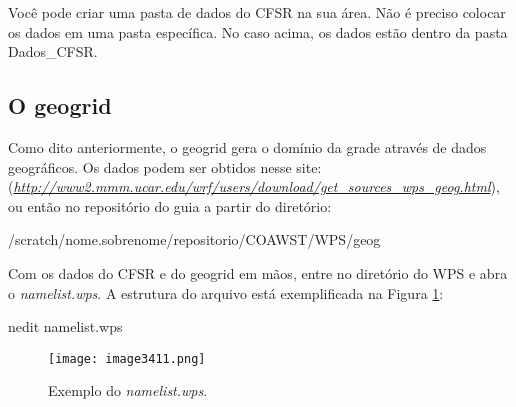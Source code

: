 \begin{tcolorbox}[enhanced,
  grow to left by=0cm,%
  grow to right by=0cm,%
  enlarge top by=0cm,%
  enlarge bottom by=0cm,%
  tcbox raise base,
  boxrule=1.0pt,
  left=18mm,
  colframe=red!50!black,coltext=red!25!black,colback=red!10!white,
  overlay={\begin{tcbclipinterior}\fill[red!75!blue!50!white] (frame.south west)
    rectangle node[text=white,font=\sffamily\bfseries\footnotesize,rotate=0] {ATENÇÃO} ([xshift=18mm]frame.north west);\end{tcbclipinterior}}]
Você pode criar uma pasta de dados do CFSR na sua área. Não é preciso colocar os dados em uma pasta específica. No caso acima, os dados estão dentro da pasta Dados\_CFSR.
\end{tcolorbox}
\bigskip

\subsection{O geogrid}\label{geowps}
\bigskip

\noindent Como dito anteriormente, o geogrid gera o domínio da grade através de dados geográficos. Os dados podem ser obtidos nesse site: (\textcolor{bleu_cite}{\href{http://www2.mmm.ucar.edu/wrf/users/download/get\_sources\_wps\_geog.html}{\textit{http://www2.mmm.ucar.edu/wrf/users/download/get\_sources\_wps\_geog.html}}}), ou então no repositório do guia a partir do diretório:
\bigskip

\begin{bashcode}
/scratch/nome.sobrenome/repositorio/COAWST/WPS/geog
\end{bashcode}
\bigskip

\noindent Com os dados do CFSR e do geogrid em mãos, entre no diretório do WPS e abra o \textit{namelist.wps}. A estrutura do arquivo está exemplificada na Figura \textcolor{bleu_cite}{\ref{namelistwps}}:
\bigskip

\begin{bashcode}
nedit namelist.wps
\end{bashcode}
\bigskip

\begin{figure}[H]
    \centering
    \texttt{[image: image3411.png]}
    \caption{Exemplo do \textit{namelist.wps}.}
    \label{namelistwps}
\end{figure}
\bigskip


